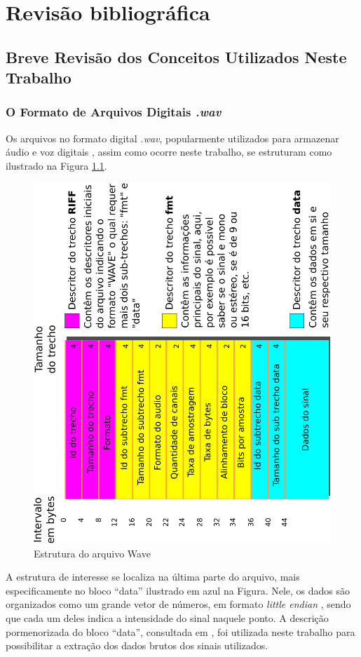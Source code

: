 \chapter{Revisão bibliográfica} \label{chap:revBibli}
	\section{Breve Revisão dos Conceitos Utilizados Neste Trabalho}

		\subsection{O Formato de Arquivos Digitais  \textit{.wav}}
			\par Os arquivos no formato digital \textit{.wav}, popularmente utilizados para armazenar áudio e voz digitais \cite{WAVE2019}, assim como ocorre neste trabalho, se estruturam como ilustrado na Figura \ref{fig:wavePcmStructure}.
		
			\begin{figure}[h]
				\centering
				\includegraphics[width=0.45\linewidth, angle=-90]{images/wavePcmStructure.pdf}
				\caption{Estrutura do arquivo Wave}
				\label{fig:wavePcmStructure}
			\end{figure}
			
			\par A estrutura de interesse se localiza na última parte do arquivo, mais especificamente no bloco ``data'' ilustrado em azul na Figura. Nele, os dados são organizados como um grande vetor de números, em formato \textit{little endian} \cite{adiga2007writing}, sendo que cada um deles indica a intensidade do sinal naquele ponto. A descrição pormenorizada do bloco ``data'', consultada em \cite{microsoftIbmWaveSpec}, foi utilizada neste trabalho para possibilitar a extração dos dados brutos dos sinais utilizados. 

